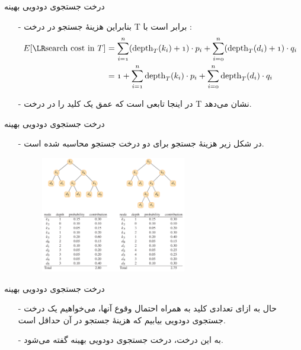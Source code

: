 \newcommand{\depth}{\text{depth}}

\begin{frame}{‌درخت جستجوی دودویی بهینه}
\begin{itemize}\itemr
\item[-]
بنابراین هزینهٔ جستجو در درخت T برابر است با :
\begin{align*}
\m{E [\txtlr{search~cost~in}~T]} & \m{~= \sum_{i=1}^n (\depth_T (k_i)+1) \cdot p_i + \sum_{i=0}^n (\depth_T (d_i)+1) \cdot q_i}\\
& \m{~= 1 + \sum_{i=1}^n \depth_T (k_i) \cdot p_i + \sum_{i=0}^n \depth_T (d_i) \cdot q_i}
\end{align*}
\item[-]
در اینجا
\m{\depth_T}
تابعی است که عمق یک کلید را در درخت T نشان می‌دهد.
\end{itemize}
\end{frame}


\begin{frame}{‌درخت جستجوی دودویی بهینه}
\begin{itemize}\itemr
\item[-]
در شکل زیر هزینهٔ جستجو برای دو درخت جستجو محاسبه شده است.
\begin{figure}
\includegraphics[width=0.6\textwidth]{figs/chap04/tree-cost}
\end{figure}
\end{itemize}
\end{frame}


\begin{frame}{‌درخت جستجوی دودویی بهینه}
\begin{itemize}\itemr
\item[-]
حال به ازای تعدادی کلید به همراه احتمال وقوع آنها، می‌خواهیم یک درخت جستجوی دودویی بیابیم که هزینهٔ جستجو در آن حداقل است.
\item[-]
به این درخت، درخت جستجوی دودویی بهینه
گفته می‌شود.
\end{itemize}
\end{frame}


